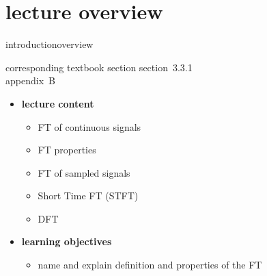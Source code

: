 


\subtitle{module 3.3.1: time-frequency representations~---~Fourier transform}


	

    \section[overview]{lecture overview}
        \begin{frame}{introduction}{overview}
            \begin{block}{corresponding textbook section}
                    section~3.3.1\\
                    appendix~B
            \end{block}

            \begin{itemize}
                \item   \textbf{lecture content}
                    \begin{itemize}
                        \item   FT of continuous signals  
                        \item   FT properties
                        \item   FT of sampled signals
                        \item   Short Time FT (STFT)
                        \item   DFT
                    \end{itemize}
                \bigskip
                \item<2->   \textbf{learning objectives}
                    \begin{itemize}
                        \item   name and explain definition and properties of the FT
                    \end{itemize}
            \end{itemize}
        \end{frame}

